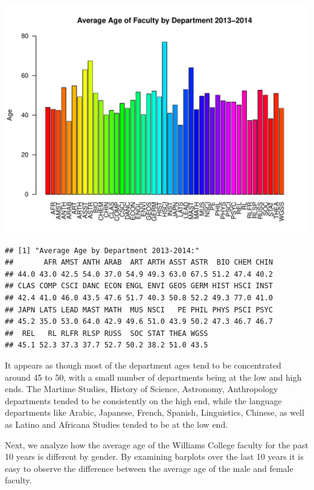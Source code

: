 \documentclass[12pt,a4paper]{article}\usepackage[]{graphicx}\usepackage[]{color}
\makeatletter
\def\maxwidth{ %
  \ifdim\Gin@nat@width>\linewidth
    \linewidth
  \else
    \Gin@nat@width
  \fi
}
\newenvironment{kframe}{%
 \def\at@end@of@kframe{}%
 \ifinner\ifhmode%
  \def\at@end@of@kframe{\end{minipage}}%
  \begin{minipage}{\columnwidth}%
 \fi\fi%
 \def\FrameCommand##1{\hskip\@totalleftmargin \hskip-\fboxsep
 \colorbox{shadecolor}{##1}\hskip-\fboxsep
     \hskip-\linewidth \hskip-\@totalleftmargin \hskip\columnwidth}%
 \MakeFramed {\advance\hsize-\width
   \@totalleftmargin\z@ \linewidth\hsize
   \@setminipage}}%
 {\par\unskip\endMakeFramed%
 \at@end@of@kframe}
\newenvironment{knitrout}{}{} %
\theoremstyle{definition}
\makeatother
\begin{document}
\begin{knitrout}
\includegraphics[width=\maxwidth]{figure/unnamed-chunk-9-10} 
\begin{kframe}\begin{verbatim}
## [1] "Average Age by Department 2013-2014:"
##       AFR AMST ANTH ARAB  ART ARTH ASST ASTR  BIO CHEM CHIN 
## 44.0 43.0 42.5 54.0 37.0 54.9 49.3 63.0 67.5 51.2 47.4 40.2 
## CLAS COMP CSCI DANC ECON ENGL ENVI GEOS GERM HIST HSCI INST 
## 42.4 41.0 46.0 43.5 47.6 51.7 40.3 50.8 52.2 49.3 77.0 41.0 
## JAPN LATS LEAD MAST MATH  MUS NSCI   PE PHIL PHYS PSCI PSYC 
## 45.2 35.0 53.0 64.0 42.9 49.6 51.0 43.9 50.2 47.3 46.7 46.7 
##  REL   RL RLFR RLSP RUSS  SOC STAT THEA WGSS 
## 45.1 52.3 37.3 37.7 52.7 50.2 38.2 51.0 43.5
\end{verbatim}
\end{kframe}
\end{knitrout}


\bigskip
It appears as though most of the department ages tend to be concentrated around 45 to 50, with a small number of departments being at the low and high ends. The Martime Studies, History of Science, Astronomy, Anthropology departments tended to be consistently on the high end, while the language departments like Arabic, Japanese, French, Spanish, Linguistics, Chinese, as well as Latino and Africana Studies tended to be at the low end.

\bigskip
Next, we analyze how the average age of the Williams College faculty for the past 10 years is different by gender. By examining barplots over the last 10 years it is easy to observe the difference between the average age of the male and female faculty.
\end{document}
